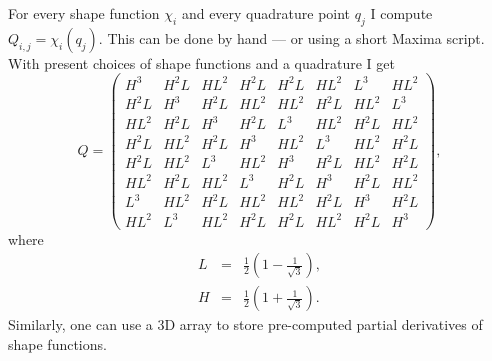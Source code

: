 \documentclass{article}
\begin{document}
For every shape function $\chi_i$ and every quadrature point $q_j$ I compute
$Q_{i, j} = \chi_i (q_j)$. This can be done by hand --- or using a short
Maxima script. With present choices of shape functions and a quadrature I get
\begin{equation}
  Q = \left(\begin{array}{llllllll}
    H^3 & H^2 L & HL^2 & H^2 L & H^2 L & HL^2 & L^3 & HL^2\\
    H^2 L & H^3 & H^2 L & HL^2 & HL^2 & H^2 L & HL^2 & L^3\\
    HL^2 & H^2 L & H^3 & H^2 L & L^3 & HL^2 & H^2 L & HL^2\\
    H^2 L & HL^2 & H^2 L & H^3 & HL^2 & L^3 & HL^2 & H^2 L\\
    H^2 L & HL^2 & L^3 & HL^2 & H^3 & H^2 L & HL^2 & H^2 L\\
    HL^2 & H^2 L & HL^2 & L^3 & H^2 L & H^3 & H^2 L & HL^2\\
    L^3 & HL^2 & H^2 L & HL^2 & HL^2 & H^2 L & H^3 & H^2 L\\
    HL^2 & L^3 & HL^2 & H^2 L & H^2 L & HL^2 & H^2 L & H^3
  \end{array} \right), \label{eq:shapefunctions}
\end{equation}
where
\begin{eqnarray*}
  L & = & \frac{1}{2} \left(1 - \frac{1}{\sqrt{3}} \right),\\
  H & = & \frac{1}{2} \left(1 + \frac{1}{\sqrt{3}} \right) .
\end{eqnarray*}
Similarly, one can use a 3D array to store pre-computed partial derivatives of
shape functions.
\end{document}
